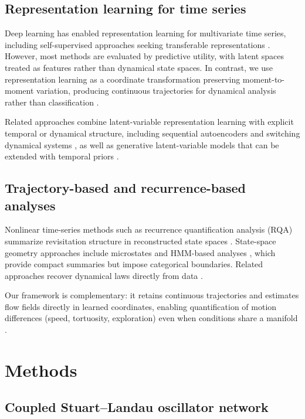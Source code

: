 \documentclass[5p,twocolumn,authoryear]{elsarticle}
\begin{document}
\subsection{Representation learning for time series}

Deep learning has enabled representation learning for multivariate time series, including self-supervised approaches seeking transferable representations \citep{Banville2021,Kostas2021}. However, most methods are evaluated by predictive utility, with latent spaces treated as features rather than dynamical state spaces. In contrast, we use representation learning as a coordinate transformation preserving moment-to-moment variation, producing continuous trajectories for dynamical analysis rather than classification \citep{Hinton2006,CunninghamYu2014}.

Related approaches combine latent-variable representation learning with explicit temporal or dynamical structure, including sequential autoencoders and switching dynamical systems \citep{Pandarinath2018,Linderman2017rSLDS}, as well as generative latent-variable models that can be extended with temporal priors \citep{KingmaWelling2014}.

\subsection{Trajectory-based and recurrence-based analyses}

Nonlinear time-series methods such as recurrence quantification analysis (RQA) summarize revisitation structure in reconstructed state spaces \citep{Marwan2007}. State-space geometry approaches include microstates \citep{Michel2018} and HMM-based analyses \citep{Baker2014,Vidaurre2018}, which provide compact summaries but impose categorical boundaries. Related approaches recover dynamical laws directly from data \citep{Brunton2016,Schmid2010DMD,Chen2018}.

Our framework is complementary: it retains continuous trajectories and estimates flow fields directly in learned coordinates, enabling quantification of motion differences (speed, tortuosity, exploration) even when conditions share a manifold \citep{TognoliKelso2014,Deco2017}.

\section{Methods}

\subsection{Coupled Stuart--Landau oscillator network}
\label{sec:synthetic_data}
\end{document}
